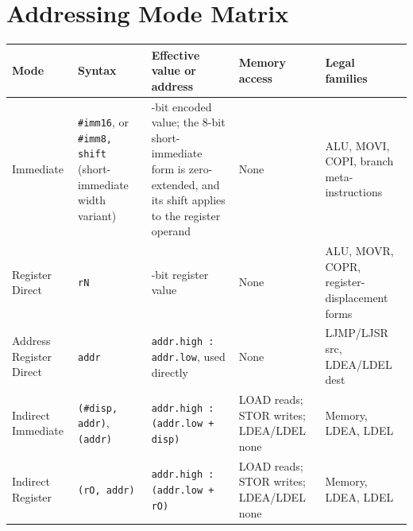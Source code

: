 \section{Addressing Mode Matrix}

\begin{table}[H]
	\centering
	\scriptsize
	\begin{tabularx}{\textwidth}{>{\raggedright\arraybackslash}p{1.8cm}>{\raggedright\arraybackslash}X>{\raggedright\arraybackslash}X>{\raggedright\arraybackslash}p{1.9cm}>{\raggedright\arraybackslash}X}
		\toprule
		\textbf{Mode}           & \textbf{Syntax}                                                             & \textbf{Effective value or address}                                                                                  & \textbf{Memory access}                  & \textbf{Legal families}                         \\
		\midrule
		Immediate               & \texttt{\#imm16}, or \texttt{\#imm8, shift} (short-immediate width variant) & 16-bit encoded value; the 8-bit short-immediate form is zero-extended, and its shift applies to the register operand & None                                    & ALU, MOVI, COPI, branch meta-instructions       \\
		Register Direct         & \texttt{rN}                                                                 & 16-bit register value                                                                                                & None                                    & ALU, MOVR, COPR, register-displacement forms    \\
		Address Register Direct & \texttt{addr}                                                               & \texttt{addr.high : addr.low}, used directly                                                                         & None                                    & LJMP/LJSR src, LDEA/LDEL dest                   \\
		Indirect Immediate      & \texttt{(\#disp, addr)}, \texttt{(addr)}                                    & \texttt{addr.high : (addr.low + disp)}                                                                               & LOAD reads; STOR writes; LDEA/LDEL none & Memory, LDEA, LDEL                              \\
		Indirect Register       & \texttt{(rO, addr)}                                                         & \texttt{addr.high : (addr.low + rO)}                                                                                 & LOAD reads; STOR writes; LDEA/LDEL none & Memory, LDEA, LDEL                              \\

\end{tabularx}
\end{table}
